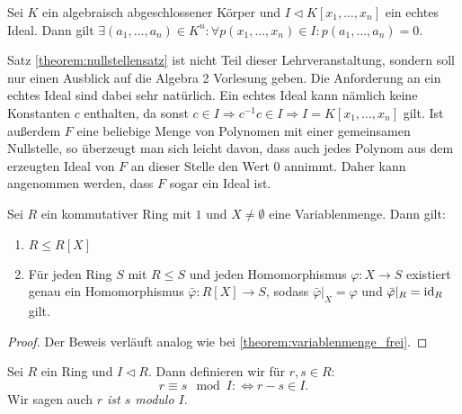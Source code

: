 \begin{theorem}\label{theorem:nullstellensatz}
    Sei $K$ ein algebraisch abgeschlossener Körper und $I\vartriangleleft K[x_1,\ldots,x_n]$ ein echtes Ideal.
    Dann gilt $\exists(a_1,\ldots,a_n)\in K^n:\forall p(x_1,\ldots,x_n)\in I:p(a_1,\ldots,a_n)=0.$
\end{theorem}

\begin{remark}
    Satz \ref{theorem:nullstellensatz} ist nicht Teil dieser Lehrveranstaltung, sondern soll nur einen Ausblick auf die Algebra 2 Vorlesung geben.
    Die Anforderung an ein echtes Ideal sind dabei sehr natürlich. Ein echtes Ideal kann nämlich keine Konstanten $c$ enthalten, da sonst
    $c\in I\Rightarrow c^{-1}c\in I\Rightarrow I=K[x_1,\ldots,x_n]$ gilt. Ist außerdem $F$ eine beliebige Menge von
    Polynomen mit einer gemeinsamen Nullstelle, so überzeugt man sich leicht davon, dass auch jedes Polynom aus dem erzeugten Ideal
    von $F$ an dieser Stelle den Wert $0$ annimmt. Daher kann \obda angenommen werden, dass $F$ sogar ein Ideal ist.
\end{remark}

\begin{proposition}
    Sei $R$ ein kommutativer Ring mit $1$ und $X\neq\emptyset$ eine Variablenmenge. Dann gilt:
    \begin{enumerate}
        \item $R\leq R[X]$
        \item Für jeden Ring $S$ mit $R\leq S$ und jeden Homomorphismus $\varphi:X\to S$
        existiert genau ein Homomorphismus $\bar{\varphi}:R[X]\to S$, sodass $\bar{\varphi}|_X=\varphi$ und $\bar{\varphi}|_R=\operatorname{id}_R$ gilt.
    \end{enumerate}
\end{proposition}

\begin{proof}
    Der Beweis verläuft analog wie bei \cref{theorem:variablenmenge_frei}.
\end{proof}


\begin{definition}
    Sei $R$ ein Ring und $I\vartriangleleft R$. Dann definieren wir für $r,s\in R$:
    $$r\equiv s\mod I:\Leftrightarrow r-s\in I.$$
    Wir sagen auch \emph{$r$ ist $s$ modulo $I$}.
\end{definition}

